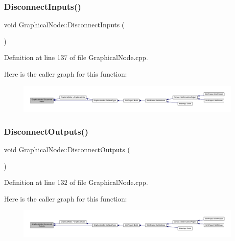\subsubsection{\texorpdfstring{Disconnect\+Inputs()}{DisconnectInputs()}}
{\footnotesize\ttfamily void Graphical\+Node\+::\+Disconnect\+Inputs (\begin{DoxyParamCaption}{ }\end{DoxyParamCaption})}



Definition at line 137 of file Graphical\+Node.\+cpp.

Here is the caller graph for this function\+:
\nopagebreak
\begin{figure}[H]
\begin{center}
\leavevmode
\includegraphics[width=350pt]{class_graphical_node_adf7b68c28c70426681cef018d34f8988_icgraph}
\end{center}
\end{figure}
\mbox{\label{class_graphical_node_a80e76a5ae9dd27b0445a1e6943074852}} 
\subsubsection{\texorpdfstring{Disconnect\+Outputs()}{DisconnectOutputs()}}
{\footnotesize\ttfamily void Graphical\+Node\+::\+Disconnect\+Outputs (\begin{DoxyParamCaption}{ }\end{DoxyParamCaption})}



Definition at line 132 of file Graphical\+Node.\+cpp.

Here is the caller graph for this function\+:
\nopagebreak
\begin{figure}[H]
\begin{center}
\leavevmode
\includegraphics[width=350pt]{class_graphical_node_a80e76a5ae9dd27b0445a1e6943074852_icgraph}
\end{center}
\end{figure}
\mbox{\label{class_graphical_node_a5675edef9951820c61973cd8fb242287}} 
